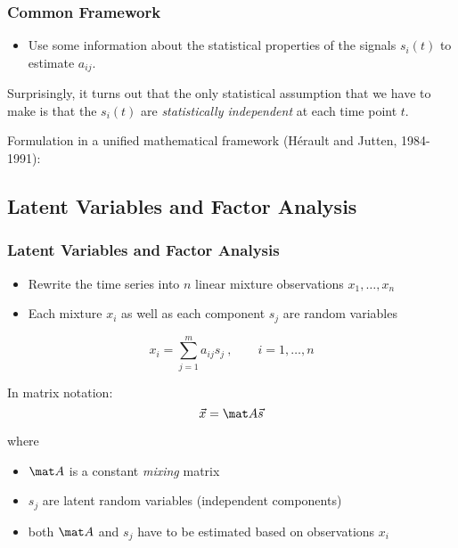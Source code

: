 \begin{frame}
  \frametitle{Common Framework}


  \begin{itemize}
    \item Use some information about the statistical properties of the signals $s_i(t)$ to estimate $a_{ij}$.
  \end{itemize}
  \pspread
 
  Surprisingly, it turns out that the only statistical assumption that we have to make is that the $s_i(t)$ are \textit{statistically independent} at each time point $t$.
  \pspread

  Formulation in a unified mathematical framework (H\'{e}rault and Jutten, 1984-1991):
  \begin{center}
  \end{center}
\end{frame}


\subsection{Latent Variables and Factor Analysis}

\begin{frame}
  \frametitle{Latent Variables and Factor Analysis}


  \begin{itemize}
    \item Rewrite the time series into $n$ linear mixture observations $x_1, \ldots, x_n$ \pause
    \item Each mixture $x_i$ as well as each component $s_j$ are random variables
  \end{itemize}

  \begin{displaymath}
    x_i = \sum_{j=1}^m a_{ij} s_j ~, \qquad i = 1,\ldots,n
  \end{displaymath}
  \pause 
  
  In matrix notation:
  \begin{displaymath}
    \vec x = \mat A \vec s
  \end{displaymath}

  where

  \begin{itemize}
    \item $\mat A$ is a constant \textit{mixing} matrix
    \item $s_j$ are latent random variables (independent components)
    \item both $\mat A$ and $s_j$ have to be estimated based on observations $x_i$
  \end{itemize}
\end{frame}


